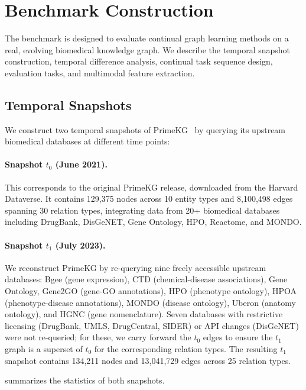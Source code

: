 \section{Benchmark Construction}
\label{sec:benchmark}

The \ours benchmark is designed to evaluate continual graph learning methods on a real, evolving biomedical knowledge graph.
We describe the temporal snapshot construction, temporal difference analysis, continual task sequence design, evaluation tasks, and multimodal feature extraction.

\subsection{Temporal Snapshots}
\label{sec:snapshots}

We construct two temporal snapshots of PrimeKG~\citep{Chandak2023} by querying its upstream biomedical databases at different time points:

\paragraph{Snapshot $t_0$ (June 2021).}
This corresponds to the original PrimeKG release, downloaded from the Harvard Dataverse.
It contains 129,375 nodes across 10 entity types and 8,100,498 edges spanning 30 relation types, integrating data from 20+ biomedical databases including DrugBank, DisGeNET, Gene Ontology, HPO, Reactome, and MONDO.

\paragraph{Snapshot $t_1$ (July 2023).}
We reconstruct PrimeKG by re-querying nine freely accessible upstream databases: Bgee (gene expression), CTD (chemical-disease associations), Gene Ontology, Gene2GO (gene-GO annotations), HPO (phenotype ontology), HPOA (phenotype-disease annotations), MONDO (disease ontology), Uberon (anatomy ontology), and HGNC (gene nomenclature).
Seven databases with restrictive licensing (DrugBank, UMLS, DrugCentral, SIDER) or API changes (DisGeNET) were not re-queried; for these, we carry forward the $t_0$ edges to ensure the $t_1$ graph is a superset of $t_0$ for the corresponding relation types.
The resulting $t_1$ snapshot contains 134,211 nodes and 13,041,729 edges across 25 relation types.

 summarizes the statistics of both snapshots.

